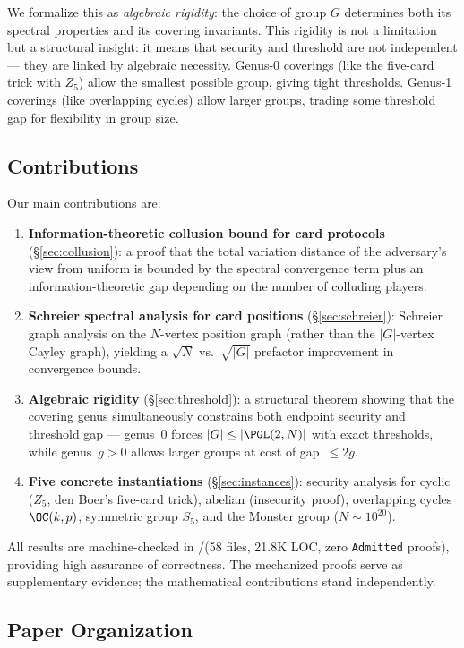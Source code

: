\documentclass[11pt,a4paper]{article}
\begin{document}
We formalize this as \emph{algebraic rigidity}: the choice of group $G$ determines both its spectral properties and its covering invariants.
This rigidity is not a limitation but a structural insight: it means that security and threshold are not independent — they are linked by algebraic necessity.
Genus-0 coverings (like the five-card trick with $Z_5$) allow the smallest possible group, giving tight thresholds.
Genus-1 coverings (like overlapping cycles) allow larger groups, trading some threshold gap for flexibility in group size.

\subsection*{Contributions}

Our main contributions are:
\begin{enumerate}
  \item \textbf{Information-theoretic collusion bound for card protocols} (\S\ref{sec:collusion}): a proof that the total variation distance of the adversary's view from uniform is bounded by the spectral convergence term plus an information-theoretic gap depending on the number of colluding players.
  \item \textbf{Schreier spectral analysis for card positions} (\S\ref{sec:schreier}): Schreier graph analysis on the $N$-vertex position graph (rather than the $|G|$-vertex Cayley graph), yielding a $\sqrt{N}$ vs.\ $\sqrt{|G|}$ prefactor improvement in convergence bounds.
  \item \textbf{Algebraic rigidity} (\S\ref{sec:threshold}): a structural theorem showing that the covering genus simultaneously constrains both endpoint security and threshold gap --- genus~0 forces $|G| \leq |\PGL(2,N)|$ with exact thresholds, while genus~$g > 0$ allows larger groups at cost of gap~$\leq 2g$.
  \item \textbf{Five concrete instantiations} (\S\ref{sec:instances}): security analysis for cyclic ($Z_5$, den Boer's five-card trick), abelian (insecurity proof), overlapping cycles $\OC(k,p)$, symmetric group $S_5$, and the Monster group ($N \sim 10^{20}$).
\end{enumerate}

All results are machine-checked in \Rocq/\MathComp (58 files, 21.8K LOC, zero \texttt{Admitted} proofs), providing high assurance of correctness.
The mechanized proofs serve as supplementary evidence; the mathematical contributions stand independently.

\subsection*{Paper Organization}
\end{document}
